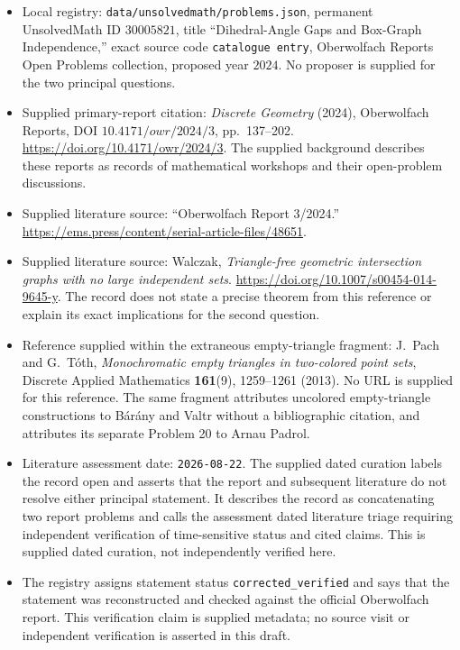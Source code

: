 \documentclass[11pt]{article}
\begin{document}
\begin{itemize}
\item Local registry: \texttt{data/unsolvedmath/problems.json}, permanent UnsolvedMath ID \(30005821\), title ``Dihedral-Angle Gaps and Box-Graph Independence,'' exact source code \texttt{catalogue entry}, Oberwolfach Reports Open Problems collection, proposed year \(2024\). No proposer is supplied for the two principal questions.
\item Supplied primary-report citation: \emph{Discrete Geometry} (2024), Oberwolfach Reports, DOI \(10.4171/owr/2024/3\), pp.~137--202. \url{https://doi.org/10.4171/owr/2024/3}. The supplied background describes these reports as records of mathematical workshops and their open-problem discussions.
\item Supplied literature source: ``Oberwolfach Report 3/2024.'' \url{https://ems.press/content/serial-article-files/48651}.
\item Supplied literature source: Walczak, \emph{Triangle-free geometric intersection graphs with no large independent sets}. \url{https://doi.org/10.1007/s00454-014-9645-y}. The record does not state a precise theorem from this reference or explain its exact implications for the second question.
\item Reference supplied within the extraneous empty-triangle fragment: J.~Pach and G.~T\'oth, \emph{Monochromatic empty triangles in two-colored point sets}, Discrete Applied Mathematics \textbf{161}(9), 1259--1261 (2013). No URL is supplied for this reference. The same fragment attributes uncolored empty-triangle constructions to B\'ar\'any and Valtr without a bibliographic citation, and attributes its separate Problem 20 to Arnau Padrol.
\item Literature assessment date: \texttt{2026-08-22}. The supplied dated curation labels the record open and asserts that the report and subsequent literature do not resolve either principal statement. It describes the record as concatenating two report problems and calls the assessment dated literature triage requiring independent verification of time-sensitive status and cited claims. This is supplied dated curation, not independently verified here.
\item The registry assigns statement status \texttt{corrected\_verified} and says that the statement was reconstructed and checked against the official Oberwolfach report. This verification claim is supplied metadata; no source visit or independent verification is asserted in this draft.
\end{itemize}
\end{document}
